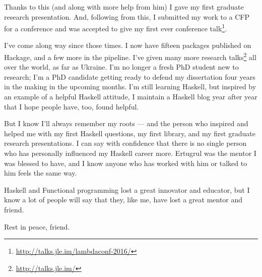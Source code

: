 \documentclass[]{article}
\renewcommand{\href}[2]{#2\footnote{\url{#1}}}
\begin{document}
Thanks to this (and along with more help from him) I gave my first graduate
research presentation. And, following from this, I submitted my work to a CFP
for a conference and was \href{http://talks.jle.im/lambdaconf-2016/}{accepted to
give my first ever conference talk}.

I've come along way since those times. I now have fifteen packages published on
Hackage, and a few more in the pipeline. I've given
\href{http://talks.jle.im/}{many more research talks} all over the world, as far
as Ukraine. I'm no longer a fresh PhD student new to research; I'm a PhD
candidate getting ready to defend my dissertation four years in the making in
the upcoming months. I'm still learning Haskell, but inspired by an example of a
helpful Haskell attitude, I maintain a Haskell blog year after year that I hope
people have, too, found helpful.

But I know I'll always remember my roots --- and the person who inspired and
helped me with my first Haskell questions, my first library, and my first
graduate research presentations. I can say with confidence that there is no
single person who has personally influenced my Haskell career more. Ertugrul was
the mentor I was blessed to have, and I know anyone who has worked with him or
talked to him feels the same way.

Haskell and Functional programming lost a great innovator and educator, but I
know a lot of people will say that they, like me, have lost a great mentor and
friend.

Rest in peace, friend.
\end{document}
